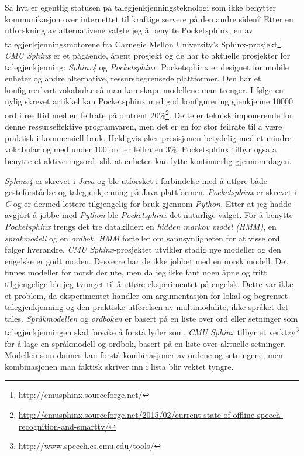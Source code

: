 Så hva er egentlig statusen på talegjenkjenningsteknologi som ikke benytter kommunikasjon over internettet til kraftige servere på den andre siden? Etter en utforskning av alternativene valgte jeg å benytte Pocketsphinx, en av talegjenkjenningsmotorene fra Carnegie Mellon University's Sphinx-prosjekt\footnote{\url{http://cmusphinx.sourceforge.net/}}. \emph{CMU Sphinx} er et pågående, åpent prosjekt og de har to aktuelle prosjekter for talegjenkjenning: \emph{Sphinx4} og \emph{Pocketsphinx}. Pocketsphinx er designet for mobile enheter og andre alternative, ressursbegrensede plattformer. Den har et konfigurerbart vokabular så man kan skape modellene man trenger. I følge en nylig skrevet artikkel kan Pocketsphinx med god konfigurering gjenkjenne 10000 ord i reelltid med en feilrate på omtrent 20\%\footnote{\url{http://cmusphinx.sourceforge.net/2015/02/current-state-of-offline-speech-recognition-and-smarttv/}}. Dette er teknisk imponerende for denne ressurseffektive programvaren, men det er en for stor feilrate til å være praktisk i kommersiell bruk. Heldigvis øker presisjonen betydelig med et mindre vokabular og med under 100 ord er feilraten 3\%. Pocketsphinx tilbyr også å benytte et aktiveringsord, slik at enheten kan lytte kontinuerlig gjennom dagen.

\emph{Sphinx4} er skrevet i \emph{Java} og ble utforsket i forbindelse med å utføre både gesteforståelse og talegjenkjenning på Java-plattformen. \emph{Pocketsphinx} er skrevet i \emph{C} og er dermed lettere tilgjengelig for bruk gjennom \emph{Python}. Etter at jeg hadde avgjort å jobbe med \emph{Python} ble \emph{Pocketsphinx} det naturlige valget. For å benytte \emph{Pocketsphinx} trengs det tre datakilder: en \emph{hidden markov model (HMM)}, en \emph{språkmodell} og en \emph{ordbok}. \emph{HMM} forteller om sannsynligheten for at visse ord følger hverandre. \emph{CMU Sphinx}-prosjektet utvikler stadig nye modeller og den engelske er godt moden. Desverre har de ikke jobbet med en norsk modell. Det finnes modeller for norsk der ute, men da jeg ikke fant noen åpne og fritt tilgjengelige ble jeg tvunget til å utføre eksperimentet på engelsk. Dette var ikke et problem, da eksperimentet handler om argumentasjon for lokal og begrenset talegjenkjenning og den praktiske utførelsen av multimodalite, ikke språket det tales. \emph{Språkmodellen} og \emph{ordboken} er basert på en liste over ord eller setninger som talegjenkjenningen skal forsøke å forstå lyder som. \emph{CMU Sphinx} tilbyr et verktøy\footnote{\url{http://www.speech.cs.cmu.edu/tools/}} for å lage en språkmodell og ordbok, basert på en liste over aktuelle setninger. Modellen som dannes kan forstå kombinasjoner av ordene og setningene, men kombinasjonen man faktisk skriver inn i lista blir vektet tyngre.

